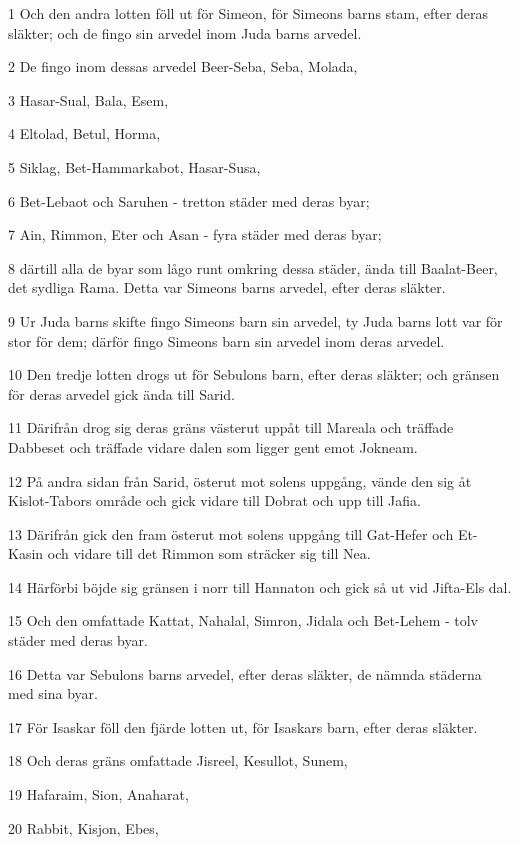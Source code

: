 \par 1 Och den andra lotten föll ut för Simeon, för Simeons barns stam, efter deras släkter; och de fingo sin arvedel inom Juda barns arvedel.
\par 2 De fingo inom dessas arvedel Beer-Seba, Seba, Molada,
\par 3 Hasar-Sual, Bala, Esem,
\par 4 Eltolad, Betul, Horma,
\par 5 Siklag, Bet-Hammarkabot, Hasar-Susa,
\par 6 Bet-Lebaot och Saruhen - tretton städer med deras byar;
\par 7 Ain, Rimmon, Eter och Asan - fyra städer med deras byar;
\par 8 därtill alla de byar som lågo runt omkring dessa städer, ända till Baalat-Beer, det sydliga Rama. Detta var Simeons barns arvedel, efter deras släkter.
\par 9 Ur Juda barns skifte fingo Simeons barn sin arvedel, ty Juda barns lott var för stor för dem; därför fingo Simeons barn sin arvedel inom deras arvedel.
\par 10 Den tredje lotten drogs ut för Sebulons barn, efter deras släkter; och gränsen för deras arvedel gick ända till Sarid.
\par 11 Därifrån drog sig deras gräns västerut uppåt till Mareala och träffade Dabbeset och träffade vidare dalen som ligger gent emot Jokneam.
\par 12 På andra sidan från Sarid, österut mot solens uppgång, vände den sig åt Kislot-Tabors område och gick vidare till Dobrat och upp till Jafia.
\par 13 Därifrån gick den fram österut mot solens uppgång till Gat-Hefer och Et-Kasin och vidare till det Rimmon som sträcker sig till Nea.
\par 14 Härförbi böjde sig gränsen i norr till Hannaton och gick så ut vid Jifta-Els dal.
\par 15 Och den omfattade Kattat, Nahalal, Simron, Jidala och Bet-Lehem - tolv städer med deras byar.
\par 16 Detta var Sebulons barns arvedel, efter deras släkter, de nämnda städerna med sina byar.
\par 17 För Isaskar föll den fjärde lotten ut, för Isaskars barn, efter deras släkter.
\par 18 Och deras gräns omfattade Jisreel, Kesullot, Sunem,
\par 19 Hafaraim, Sion, Anaharat,
\par 20 Rabbit, Kisjon, Ebes,
